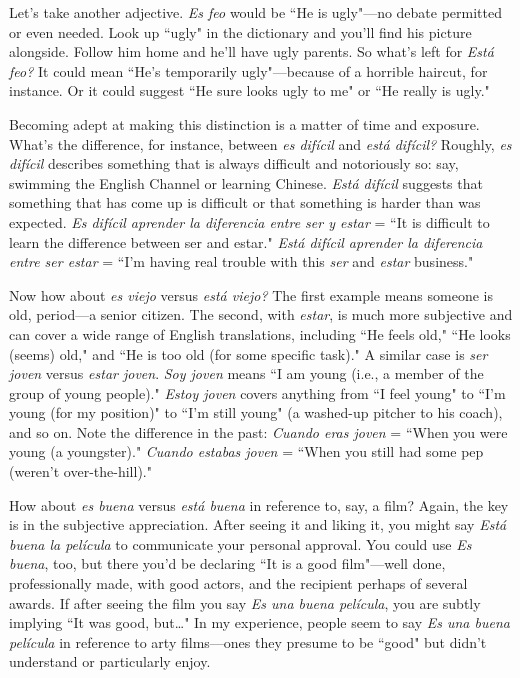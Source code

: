 Let's take another adjective. \emph{Es feo} would be ``He is ugly"---no
debate permitted or even needed. Look up ``ugly" in the dictionary and
you'll find his picture alongside. Follow him home and he'll have ugly
parents. So what's left for \emph{Está feo?} It could mean ``He's temporarily
ugly"---because of a horrible haircut, for instance. Or it could suggest
``He sure looks ugly to me" or ``He really is ugly."

Becoming adept at making this distinction is a matter of time
and exposure. What's the difference, for instance, between \emph{es difícil}
and \emph{está difícil?} Roughly, \emph{es difícil} describes something that is always
difficult and notoriously so: say, swimming the English Channel or
learning Chinese. \emph{Está difícil} suggests that something that has come
up is difficult or that something is harder than was expected. \emph{Es difícil aprender la diferencia entre ser y estar}
 = ``It is difficult to learn the
 difference between ser and estar." \emph{Está difícil aprender la diferencia
 entre ser estar} = ``I'm having real trouble with this \emph{ser} and \emph{estar}
business."

Now how about \emph{es viejo} versus \emph{está viejo?} The first example
means someone is old, period---a senior citizen. The second, with
\emph{estar}, is much more subjective and can cover a wide range of English
translations, including ``He feels old," ``He looks (seems) old," and
``He is too old (for some specific task)." A similar case is \emph{ser joven}
versus \emph{estar joven}. \emph{Soy joven} means ``I am young (i.e., a member
of the group of young people)." \emph{Estoy joven} covers anything from ``I
feel young" to ``I'm young (for my position)" to ``I'm still young" (a
washed-up pitcher to his coach), and so on. Note the difference in the
past: \emph{Cuando eras joven} = ``When you were young (a youngster)."
\emph{Cuando estabas joven} = ``When you still had some pep (weren't over-the-hill)."

How about \emph{es buena} versus \emph{está buena} in reference to, say, a
film? Again, the key is in the subjective appreciation. After seeing it
and liking it, you might say \emph{Está buena la película} to communicate
your personal approval. You could use \emph{Es buena}, too, but there you'd
be declaring ``It is a good film"---well done, professionally made, with
good actors, and the recipient perhaps of several awards. If after seeing
the film you say \emph{Es una buena película}, you are subtly implying ``It
was good, but\ldots{}" In my experience, people seem to say \emph{Es una
buena película} in reference to arty films---ones they presume to be
``good" but didn't understand or particularly enjoy.

